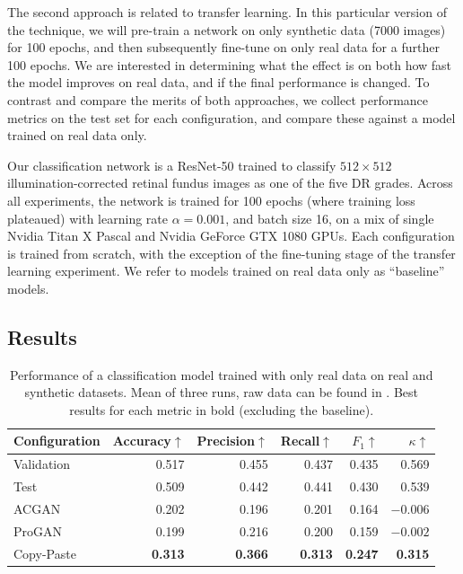 The second approach is related to transfer learning.
In this particular version of the technique, we will pre-train a network on only synthetic data (7000 images) for 100 epochs, and then subsequently fine-tune on only real data for a further 100 epochs.
We are interested in determining what the effect is on both how fast the model improves on real data, and if the final performance is changed.
To contrast and compare the merits of both approaches, we collect performance metrics on the test set for each configuration, and compare these against a model trained on real data only.

Our classification network is a ResNet-50 trained to classify $512\times 512$ illumination-corrected retinal fundus images as one of the five DR grades.
Across all experiments, the network is trained for 100 epochs (where training loss plateaued) with learning rate $\alpha = 0.001$, and batch size 16, on a mix of single Nvidia Titan X Pascal and Nvidia GeForce GTX 1080 GPUs.
Each configuration is trained from scratch, with the exception of the fine-tuning stage of the transfer learning experiment.
We refer to models trained on real data only as ``baseline'' models.

\subsection{Results}

\begin{table}[h]
    \centering
    \begin{tabular}{lrrrrr}
    \toprule
        Configuration & Accuracy$\uparrow$ & Precision$\uparrow$ & Recall$\uparrow$ & $F_1$$\uparrow$ & $\kappa$$\uparrow$ \\
    \midrule 
    Validation & 0.517 & 0.455 & 0.437 & 0.435 & 0.569 \\
    Test & 0.509 & 0.442 & 0.441 &0.430 & 0.539 \\
    \midrule
        ACGAN & 0.202 & 0.196 & 0.201 & 0.164 & $-0.006$ \\
    \midrule
        ProGAN & 0.199 & 0.216 & 0.200 & 0.159 & $-0.002$ \\
    \midrule
        Copy-Paste & \textbf{0.313} & \textbf{0.366} & \textbf{0.313} & \textbf{0.247} & \textbf{0.315} \\
    \bottomrule
    \end{tabular}
    \caption{Performance of a classification model trained with only real data on real and synthetic datasets. Mean of three runs, raw data can be found in . Best results for each metric in bold (excluding the baseline).}
    \label{tab:classification_performance}
\end{table}

